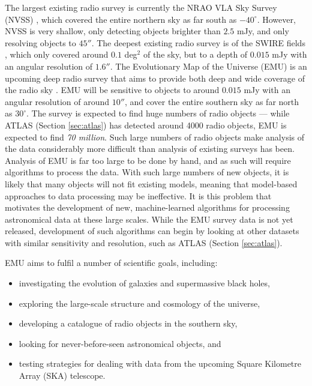             The largest existing radio survey is currently the NRAO VLA Sky
            Survey (NVSS) \citep{condon98}, which covered the entire northern
            sky as far south as $-40^\circ$. However, NVSS is very shallow, only
            detecting objects brighter than $2.5$ mJy, and only resolving
            objects to $45''$. The deepest existing radio survey is of the SWIRE
            fields \citep{owen08}, which only covered around $0.1$ deg$^2$ of
            the sky, but to a depth of $0.015$ mJy with an angular resolution of
            $1.6''$. The Evolutionary Map of the Universe (EMU) is an upcoming
            deep radio survey that aims to provide both deep and wide coverage
            of the radio sky \citep{norris11}. EMU will be sensitive to objects
            to around $0.015$ mJy with an angular resolution of around $10''$,
            and cover the entire southern sky as far north as $30^\circ$. The
            survey is expected to find huge numbers of radio objects --- while
            ATLAS (Section \ref{sec:atlas}) has detected around 4000 radio
            objects, EMU is expected to find \emph{70 million}. Such large
            numbers of radio objects make analysis of the data considerably more
            difficult than analysis of existing surveys has been. Analysis of
            EMU is far too large to be done by hand, and as such will require
            algorithms to process the data. With such large numbers of new
            objects, it is likely that many objects will not fit existing
            models, meaning that model-based approaches to data processing may
            be ineffective. It is this problem that motivates the development of
            new, machine-learned algorithms for processing astronomical data at
            these large scales. While the EMU survey data is not yet released,
            development of such algorithms can begin by looking at other
            datasets with similar sensitivity and resolution, such as ATLAS
            (Section \ref{sec:atlas}).

            EMU aims to fulfil a number of scientific goals, including:
            \begin{itemize}
                \setlength\itemsep{0 pt}
                \item investigating the evolution of galaxies and supermassive
                    black holes,
                \item exploring the large-scale structure and cosmology of the
                    universe,
                \item developing a catalogue of radio objects in the southern
                    sky,
                \item looking for never-before-seen astronomical objects, and
                \item testing strategies for dealing with data from the upcoming
                    Square Kilometre Array (SKA) telescope.
            \end{itemize}

